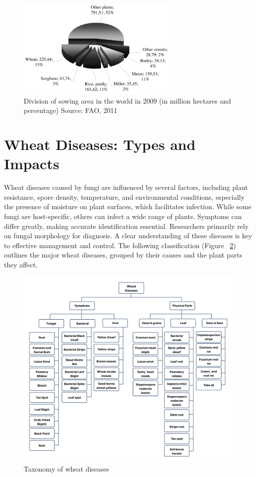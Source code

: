 \begin{figure}[H]
    \centering
    \includegraphics[width=0.7\textwidth]{chapters/chapter2/images/Figure01.png}
    \caption{Division of sowing area in the world in 2009 (in million hectares and percentage) Source: FAO, 2011}
    \label{fig:Figure01}
\end{figure}


\section{Wheat Diseases: Types and Impacts}

Wheat diseases caused by fungi are influenced by several factors, including plant resistance, spore density, temperature, and environmental conditions, especially the presence of moisture on plant surfaces, which facilitates infection. While some fungi are host-specific, others can infect a wide range of plants. Symptoms can differ greatly, making accurate identification essential. Researchers primarily rely on fungal morphology for diagnosis. A clear understanding of these diseases is key to effective management and control. The following classification (Figure ~\ref{fig:Figure02}) outlines the major wheat diseases, grouped by their causes and the plant parts they affect.

\begin{figure}[H]
    \centering
    \includegraphics[width=0.8
    \textwidth]{chapters/chapter2/images/Figure02.png}
    \caption{Taxonomy of wheat diseases \protect\parencite{haider2021wheat}}
    \label{fig:Figure02}
\end{figure}

